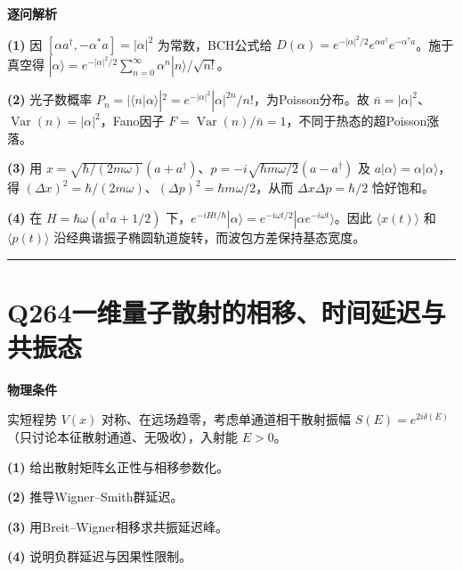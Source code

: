 \documentclass[UTF8,a4paper,11pt,oneside,openany]{ctexbook}
\begin{document}
\par\medskip\noindent\textbf{逐问解析}
\par\noindent\textbf{(1)} 因 \([\alpha a^\dagger,-\alpha^*a]=|\alpha|^2\) 为常数，BCH公式给 \(D(\alpha)=e^{-|\alpha|^2/2}e^{\alpha a^\dagger}e^{-\alpha^*a}\)。施于真空得 \(|\alpha\rangle=e^{-|\alpha|^2/2}\sum_{n=0}^\infty\alpha^n|n\rangle/\sqrt{n!}\)。
\par\noindent\textbf{(2)} 光子数概率 \(P_n=|\langle n|\alpha\rangle|^2=e^{-|\alpha|^2}|\alpha|^{2n}/n!\)，为Poisson分布。故 \(\bar n=|\alpha|^2\)、\(\operatorname{Var}(n)=|\alpha|^2\)，Fano因子 \(F=\operatorname{Var}(n)/\bar n=1\)，不同于热态的超Poisson涨落。
\par\noindent\textbf{(3)} 用 \(x=\sqrt{\hbar/(2m\omega)}(a+a^\dagger)\)、\(p=-i\sqrt{\hbar m\omega/2}(a-a^\dagger)\) 及 \(a|\alpha\rangle=\alpha|\alpha\rangle\)，得 \((\Delta x)^2=\hbar/(2m\omega)\)、\((\Delta p)^2=\hbar m\omega/2\)，从而 \(\Delta x\Delta p=\hbar/2\) 恰好饱和。
\par\noindent\textbf{(4)} 在 \(H=\hbar\omega(a^\dagger a+1/2)\) 下，\(e^{-iHt/\hbar}|\alpha\rangle=e^{-i\omega t/2}|\alpha e^{-i\omega t}\rangle\)。因此 \(\langle x(t)\rangle\) 和 \(\langle p(t)\rangle\) 沿经典谐振子椭圆轨道旋转，而波包方差保持基态宽度。

\par\bigskip\hrule\bigskip
\section*{Q264\quad 一维量子散射的相移、时间延迟与共振态}
\textbf{物理条件}\par 实短程势 \(V(x)\) 对称、在远场趋零，考虑单通道相干散射振幅 \(S(E)=e^{2i\delta(E)}\)（只讨论本征散射通道、无吸收），入射能 \(E>0\)。
\par\noindent\textbf{(1)} 给出散射矩阵幺正性与相移参数化。
\par\noindent\textbf{(2)} 推导Wigner–Smith群延迟。
\par\noindent\textbf{(3)} 用Breit–Wigner相移求共振延迟峰。
\par\noindent\textbf{(4)} 说明负群延迟与因果性限制。
\end{document}
